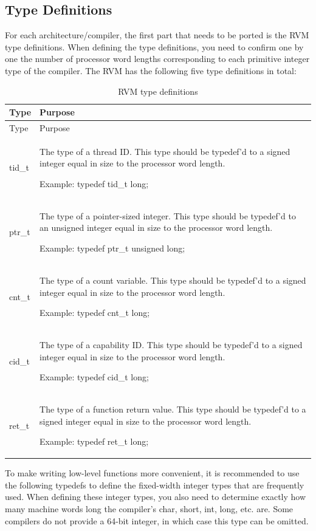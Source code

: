 \subsection{Type Definitions}\label{subsec:8-2-1}

For each architecture/compiler, the first part that needs to be ported is the RVM type definitions. When defining the type definitions, you need to confirm one by one the number of processor word lengths corresponding to each primitive integer type of the compiler. The RVM has the following five type definitions in total:

\begin{xltabular}{\textwidth}{@{}>{\hsize\raggedright\arraybackslash}X>{\hsize\raggedright\arraybackslash}X@{}}
\caption{RVM type definitions}\label{tab:8-1}\\
\toprule
Type & Purpose\tabularnewline
\endfirsthead
\toprule
Type & Purpose\tabularnewline
\midrule
\endhead
\bottomrule
\endlastfoot
tid\_\allowbreak{}t\strut
 & The type of a thread ID. This type should be typedef'd to a signed integer equal in size to the processor word length.

Example: typedef tid\_t long;\strut
\tabularnewline
ptr\_\allowbreak{}t\strut
 & The type of a pointer-sized integer. This type should be typedef'd to an unsigned integer equal in size to the processor word length.

Example: typedef ptr\_t unsigned long;\strut
\tabularnewline
cnt\_\allowbreak{}t\strut
 & The type of a count variable. This type should be typedef'd to a signed integer equal in size to the processor word length.

Example: typedef cnt\_t long;\strut
\tabularnewline
cid\_\allowbreak{}t\strut
 & The type of a capability ID. This type should be typedef'd to a signed integer equal in size to the processor word length.

Example: typedef cid\_t long;\strut
\tabularnewline
ret\_\allowbreak{}t\strut
 & The type of a function return value. This type should be typedef'd to a signed integer equal in size to the processor word length.

Example: typedef ret\_t long;\strut
\tabularnewline
\end{xltabular}

To make writing low-level functions more convenient, it is recommended to use the following typedefs to define the fixed-width integer types that are frequently used. When defining these integer types, you also need to determine exactly how many machine words long the compiler's char, short, int, long, etc. are. Some compilers do not provide a 64-bit integer, in which case this type can be omitted.

